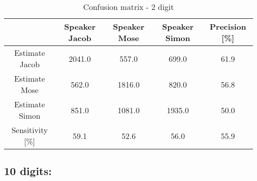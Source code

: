 \begin{table}[H]                                                    
\centering                                                          
\begin{tabular}{|c|c|c|c|c|}                                        
\hline                                                              
  & Speaker Jacob & Speaker Mose & Speaker Simon & Precision [\%] \\
\hline                                                              
Estimate Jacob & 2041.0 & 557.0 & 699.0 & 61.9 \\                   
\hline                                                              
Estimate Mose & 562.0 & 1816.0 & 820.0 & 56.8 \\                    
\hline                                                              
Estimate Simon & 851.0 & 1081.0 & 1935.0 & 50.0 \\                  
\hline                                                              
Sensitivity [\%] & 59.1 & 52.6 & 56.0 & 55.9 \\                     
\hline                                                              
\end{tabular}                                                       
\caption{Confusion matrix - 2 digit}                                
\label{table:Lin_conf_2}                                            
\end{table}                                


\subsection{10 digits:}


